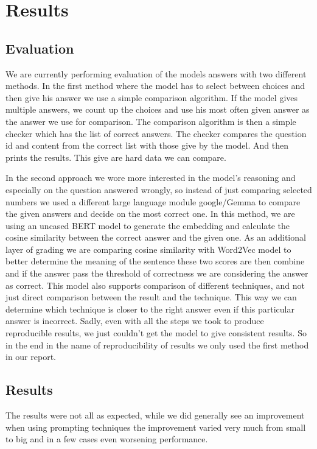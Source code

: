 \documentclass[fleqn,moreauthors,10pt]{ds_report}
\begin{document}
\section*{Results}
\subsection*{Evaluation}
We are currently performing evaluation of the models answers with two different methods. In the first method where the model has to select between choices and then give his answer we use a simple comparison algorithm. If the model gives multiple answers, we count up the choices and use his most often given answer as the answer we use for comparison. The comparison algorithm is then a simple checker which has the list of correct answers. The checker compares the question id and content from the correct list with those give by the model. And then prints the results. This give are hard data we can compare.

In the second approach we wore more interested in the model's reasoning and especially on the question answered wrongly, so instead of just comparing selected numbers we used a different large language module google/Gemma to compare the given answers and decide on the most correct one. In this method, we are using an uncased BERT model to generate the embedding and calculate the cosine similarity between the correct answer and the given one. As an additional layer of grading we are comparing cosine similarity with Word2Vec model to better determine the meaning of the sentence these two scores are then combine and if the answer pass the threshold of correctness we are considering the answer as correct. This model also supports comparison of different techniques, and not just direct comparison between the result and the technique. This way we can determine which technique is closer to the right answer even if this particular answer is incorrect. Sadly, even with all the steps we took to produce reproducible results, we just couldn't get the model to give consistent results. So in the end in the name of reproducibility of results we only used the first method in our report.


\subsection*{Results}
The results were not all as expected, while we did generally see an improvement when using prompting techniques the improvement varied very much from small to big and in a few cases even worsening performance.
\end{document}
